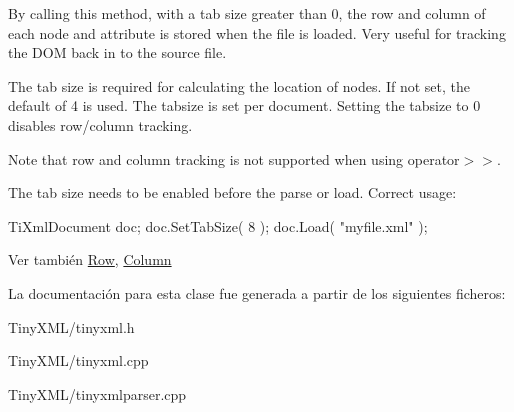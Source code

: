 By calling this method, with a tab size greater than 0, the row and column of each node and attribute is stored when the file is loaded. Very useful for tracking the D\-O\-M back in to the source file.

The tab size is required for calculating the location of nodes. If not set, the default of 4 is used. The tabsize is set per document. Setting the tabsize to 0 disables row/column tracking.

Note that row and column tracking is not supported when using operator$>$$>$.

The tab size needs to be enabled before the parse or load. Correct usage\-: \begin{DoxyVerb}TiXmlDocument doc;
doc.SetTabSize( 8 );
doc.Load( "myfile.xml" );
\end{DoxyVerb}


\begin{DoxySeeAlso}{Ver también}
\hyperlink{class_ti_xml_base_a024bceb070188df92c2a8d8852dd0853}{Row}, \hyperlink{class_ti_xml_base_ab54bfb9b70fe6dd276e7b279cab7f003}{Column} 
\end{DoxySeeAlso}


La documentación para esta clase fue generada a partir de los siguientes ficheros\-:\begin{DoxyCompactItemize}
\item 
Tiny\-X\-M\-L/tinyxml.\-h\item 
Tiny\-X\-M\-L/tinyxml.\-cpp\item 
Tiny\-X\-M\-L/tinyxmlparser.\-cpp\end{DoxyCompactItemize}
